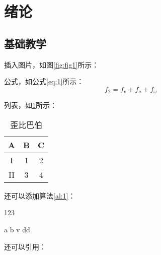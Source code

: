 \section{绪\hspace{1em}论}

\subsection{基础教学}

插入图片，如图\ref{fig:fig1}所示：


公式，如公式\ref{eq:1}所示：
\begin{equation}
    \label{eq:1}
    f_2 = f_v + f_a + f_{\omega}
\end{equation}

列表，如\ref{chart:1}所示：
\begin{table}[!ht]
    \centering
    \caption{歪比巴伯}
    \label{chart:1}
    \begin{tabular}{ccc}
    \toprule
        A & B & C  \\ \midrule
        I & 1 & 2  \\ 
        II & 3 & 4 \\ \bottomrule
    \end{tabular}
\end{table}

还可以添加算法\ref{al:1}：
\begin{algorithm}[ht]
    \caption{123}\label{al:1}
    \begin{algorithmic}[1]
        \Require a
			\Ensure b
            \State v
			\State \Return dd
            \Else
            \EndIf	
			\EndWhile
    \end{algorithmic}
\end{algorithm}

还可以引用：\cite{张立先2011数控机床高速微线段插补算法与自适应前瞻处理}

